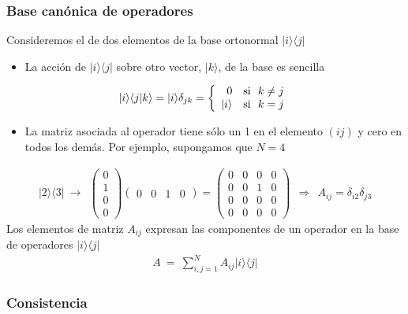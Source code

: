 \documentclass[letterpaper,10pt,english]{jupyterBook}
\newcommand{\ket}[1]{|#1\rangle}
\newcommand{\braket}[2]{\langle #1|#2\rangle}
\newcommand{\ketbra}[2]{| #1\rangle \langle #2 |}
\begin{document}
\subsubsection{Base canónica de operadores}
\label{\detokenize{docs/Part_01_Formalismo/Chapter_01_02_Formalismo_matem_xe1tico/01_03_Operadores_myst:base-canonica-de-operadores}}
\sphinxAtStartPar


\sphinxAtStartPar
Consideremos el  de dos elementos de la base ortonormal
\(\ketbra{i}{j}\)
\begin{itemize}
\item {} 
\sphinxAtStartPar
La acción de \(\ketbra{i}{j}\) sobre otro vector, \(\ket{k}\),  de la base es sencilla

\end{itemize}
\begin{equation*}
\begin{split}
 \ket{i}\braket{j}{k} = \ket{i} \delta_{jk} = \left\{ \begin{array}{rl}
0 & {\rm si} ~~k\neq j \\ \ket{i} & {\rm si} ~~ k=j \end{array} \right.
\end{split}
\end{equation*}\begin{itemize}
\item {} 
\sphinxAtStartPar
La matriz asociada al operador  tiene sólo un 1 en el elemento \((ij)\) y cero en todos los demás. Por ejemplo, supongamos que
\(N=4\)

\end{itemize}
\begin{equation*}
\begin{split}
\ketbra{2}{3} ~\to ~~
 \begin{pmatrix} 0 \\ 1 \\ 0 \\ 0 \end{pmatrix}\begin{pmatrix} 0 & 0 & 1 & 0 \end{pmatrix} = 
\begin{pmatrix}
0 &  0 & 0 &  0 \\  0 &  0 & 1&  0 \\ 0 &  0 & 0 &  0 \\ 0 &  0 & 0 &  0
\end{pmatrix} ~~\Rightarrow ~~ A_{ij} = \delta_{i2}\delta_{j3}
\end{split}
\end{equation*}
\sphinxAtStartPar
Los elementos de matriz \(A_{ij}\) expresan las componentes de un operador en la base de operadores \(\ketbra{i}{j}\)
\begin{equation*}
\begin{split}
A ~=~ \sum_{i,j=1}^N A_{ij} \ketbra{i}{j} 
\end{split}
\end{equation*}\subsubsection*{Consistencia}
\end{document}

